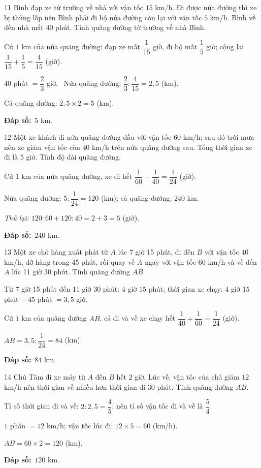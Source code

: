 \documentclass[11pt]{article}
\newif\ifsol \solfalse
\providecommand{\AnsWord}{Đáp số}
\newcommand{\dapso}[1]{\par\textbf{\AnsWord:}\ #1}
\newcommand{\probsol}[1]{%
  \begin{lrbox}{\solmeasure}\begin{minipage}{\dimexpr\linewidth-24pt\relax}#1\end{minipage}\end{lrbox}%
  \ifsol
    \begin{solbox}#1\end{solbox}%
  \else
    \setlength{\solht}{\dimexpr\ht\solmeasure+\dp\solmeasure+0.85cm\relax}%
    \ifdim\solht<1.35cm\setlength{\solht}{1.35cm}\fi
    \begin{tcolorbox}[colback=white,colframe=Line,boxrule=0.8pt,arc=5pt,
      left=8pt,right=8pt,top=4pt,bottom=4pt,height=\solht]{\footnotesize\color{Slate}\itshape\WorkWord}\end{tcolorbox}%
  \fi}
\newcommand{\gap}{\vspace{0.3cm}}
\def\WorkWord{Bài làm:}
\def\AnsWord{Đáp số}
\begin{document}
\gap
\begin{probbox}{11}{\relax}
Bình đạp xe từ trường về nhà với vận tốc $15$ km/h. Đi được nửa đường thì xe bị thủng lốp nên Bình phải đi bộ nửa đường còn lại với vận tốc $5$ km/h. Bình về đến nhà mất $40$ phút. Tính quãng đường từ trường về nhà Bình.
\end{probbox}
\probsol{
Cứ $1$ km của nửa quãng đường: đạp xe mất $\dfrac1{15}$ giờ, đi bộ mất $\dfrac15$ giờ; cộng lại $\dfrac1{15}+\dfrac15=\dfrac4{15}$ (giờ).\par
$40$ phút $=\dfrac23$ giờ. \ Nửa quãng đường: $\dfrac23:\dfrac4{15}=2{,}5$ (km).\par Cả quãng đường: $2{,}5\times2=5$ (km).
\dapso{$5$ km.}}
\gap
\begin{probbox}{12}{\relax}
Một xe khách đi nửa quãng đường đầu với vận tốc $60$ km/h; sau đó trời mưa nên xe giảm vận tốc còn $40$ km/h trên nửa quãng đường sau. Tổng thời gian xe đi là $5$ giờ. Tính độ dài quãng đường.
\end{probbox}
\probsol{
Cứ $1$ km của nửa quãng đường, xe đi hết $\dfrac1{60}+\dfrac1{40}=\dfrac1{24}$ (giờ).\par
Nửa quãng đường: $5:\dfrac1{24}=120$ (km); cả quãng đường: $240$ km.\par
\emph{Thử lại:} $120:60+120:40=2+3=5$ (giờ).
\dapso{$240$ km.}}
\gap
\begin{probbox}{13}{\relax}
Một xe chở hàng xuất phát từ $A$ lúc 7 giờ 15 phút, đi đến $B$ với vận tốc $40$ km/h, dỡ hàng trong $45$ phút, rồi quay về $A$ ngay với vận tốc $60$ km/h và về đến $A$ lúc 11 giờ 30 phút. Tính quãng đường $AB$.
\end{probbox}
\probsol{
Từ 7 giờ 15 phút đến 11 giờ 30 phút: $4$ giờ $15$ phút; thời gian xe chạy: $4$ giờ $15$ phút $-\ 45$ phút $=3{,}5$ giờ.\par
Cứ $1$ km của quãng đường $AB$, cả đi và về xe chạy hết $\dfrac1{40}+\dfrac1{60}=\dfrac1{24}$ (giờ).\par $AB=3{,}5:\dfrac1{24}=84$ (km).
\dapso{$84$ km.}}
\gap
\begin{probbox}{14}{\relax}
Chú Tâm đi xe máy từ $A$ đến $B$ hết $2$ giờ. Lúc về, vận tốc của chú giảm $12$ km/h nên thời gian về nhiều hơn thời gian đi $30$ phút. Tính quãng đường $AB$.
\end{probbox}
\probsol{
Tỉ số thời gian đi và về: $2:2{,}5=\dfrac45$; nên tỉ số vận tốc đi và về là $\dfrac54$.\par
$1$ phần $=12$ km/h; vận tốc lúc đi: $12\times5=60$ (km/h).\par $AB=60\times2=120$ (km).
\dapso{$120$ km.}}
\end{document}
